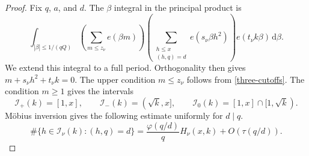 \documentclass[12pt,reqno]{amsart}
\numberwithin{equation}{section}
\theoremstyle{plain}
\theoremstyle{remark}
\newcommand{\dif}{\mathrm{d}}
\begin{document}
\begin{proof}
Fix $q$, $a$, and $d$.  The $\beta$ integral in the principal product
is
\[
 \int_{|\beta|\leq1/(qQ)}
 \left(\sum_{m\leq z_\nu}e(\beta m)\right)
 \left(\sum_{\substack{h\leq x\\(h,q)=d}}e(s_\nu\beta h^2)\right)
 e(t_\nu k\beta)\,\dif\beta.
\]
We extend this integral to a full period.  Orthogonality then gives
$m+s_\nu h^2+t_\nu k=0$.  The upper condition $m\leq z_\nu$ follows
from \eqref{three-cutoffs}.  The condition $m\geq1$ gives the intervals
\[
 \mathcal I_+(k)=[1,x],\qquad
 \mathcal I_-(k)=(\sqrt k,x],\qquad
 \mathcal I_0(k)=[1,x]\cap[1,\sqrt{k}).
\]
M\"obius inversion gives the following estimate uniformly for
$d\mid q$.
\begin{equation}\label{unified-coprime-count}
 \#\{h\in\mathcal I_\nu(k):(h,q)=d\}
 =\frac{\varphi(q/d)}qH_\nu(x,k)+O(\tau(q/d)).
\end{equation}


\end{proof}
\end{document}
